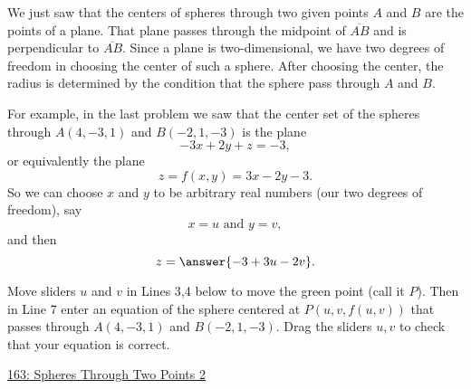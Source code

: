 \documentclass{ximera}
\begin{document}
\begin{question}  \label{Q2231324ffh}
We just saw that the centers of spheres through two given points $A$ and $B$ are the points of a plane. That plane passes through the midpoint of $\overline{AB}$ and is perpendicular to $\overline{AB}$. Since a plane is two-dimensional, we have two degrees of freedom in choosing the center of such a sphere. After choosing the center, the radius is determined by the condition that the sphere pass through $A$ and $B$.

For example, in the last problem we saw that the center set of the spheres through $A(4,-3,1)$ and $B(-2,1,-3)$ is the plane
\[
 -3x + 2y +z = -3 ,
\]
or equivalently the plane
\[
   z = f(x,y) = 3x - 2y - 3.
\]
So we can choose $x$ and $y$ to be arbitrary real numbers (our two degrees of freedom), say 
\[
    x = u  \text{ and } y = v ,
\]
and then
\[
  z = \answer{-3 + 3u - 2v} .
\]


Move sliders $u$ and $v$ in Lines 3,4 below to move the green point (call it $P$). Then in Line 7 enter an equation of the sphere centered at $P(u,v,f(u,v))$ that passes through $A(4,-3,1)$ and $B(-2,1,-3)$. Drag the sliders $u,v$ to check that your equation is correct.
\begin{onlineOnly}
    \begin{center}
\end{center}
\end{onlineOnly}

\href{https://www.desmos.com/3d/e9vq8rri9k}{163: Spheres Through Two Points 2}

\end{question}
\end{document}
